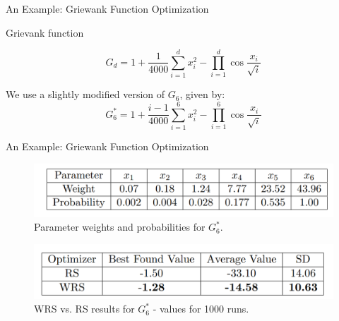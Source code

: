 \documentclass{beamer}
\begin{document}
\begin{frame}{An Example: Griewank Function Optimization}
\centering
\begin{block}{Grievank function}

\[G_d = 1 + \frac{1}{4000}\sum_{i=1}^d x_i^2 - \prod_{i=1}^d \cos\frac{x_i}{\sqrt{i}}\]

We use a slightly modified version of $G_6$, given by:
\[G_6^{*} = 1 + \frac{i - 1}{4000}\sum_{i=1}^6 x_i^2 - \prod_{i=1}^6 \cos\frac{x_i}{\sqrt{i}}\]
\end{block}
\end{frame}
\begin{frame}{An Example: Griewank Function Optimization}
\centering
\begin{figure}
        \centering
        \includegraphics[scale=0.6]{images/wrs3.png} 
        \caption{Parameter weights and probabilities for $G^{*}_6$.}
\end{figure}

\begin{figure}
        \centering 
        \includegraphics[scale=0.6]{images/wrs4.png}
        \caption{WRS vs. RS results for $G^{*}_6$ - values for 1000 runs.}
\end{figure}
 
\end{frame}
\end{document}
